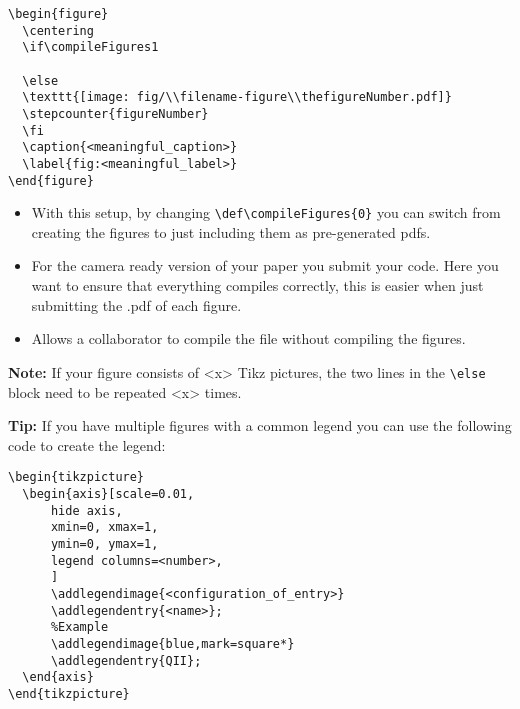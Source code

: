 \verb|\begin{figure}|\\
\verb|	\centering|\\
\verb|	\if\compileFigures1|\\
\verb|	|\\
\verb|	\else|\\
\verb|	\texttt{[image: fig/\\filename-figure\\thefigureNumber.pdf]}|\\
\verb|	\stepcounter{figureNumber}|\\
\verb|	\fi|\\
\verb|	\caption{<meaningful_caption>}|\\
\verb|	\label{fig:<meaningful_label>}|\\
\verb|\end{figure}|

\begin{whyblock}
\begin{itemize}
\item With this setup, by changing \verb|\def\compileFigures{0}| you can switch from creating the figures to just including them as pre-generated pdfs.
\item For the camera ready version of your paper you submit your code. Here you want to ensure that everything compiles correctly, this is easier when just submitting the .pdf of each figure.
\item Allows a collaborator to compile the file without compiling the figures.
\end{itemize}
\end{whyblock}

\textbf{Note:} If your figure consists of <x> Tikz pictures, the two lines in the \verb|\else| block need to be repeated <x> times.

\textbf{Tip:} If you have multiple figures with a common legend you can use the following code to create the legend:

\verb|\begin{tikzpicture}|\\
\verb|	\begin{axis}[scale=0.01,|\\
\verb|		hide axis,|\\
\verb|		xmin=0, xmax=1,|\\
\verb|		ymin=0, ymax=1,|\\
\verb|		legend columns=<number>,|\\
\verb|		]|\\
\verb|		\addlegendimage{<configuration_of_entry>}|\\
\verb|		\addlegendentry{<name>};|\\
\verb|		%Example|\\
\verb|		\addlegendimage{blue,mark=square*}|\\
\verb|		\addlegendentry{QII};|\\
\verb|	\end{axis}|\\
\verb|\end{tikzpicture}|